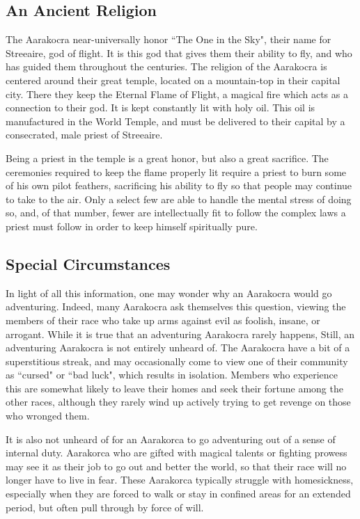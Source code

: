 \begin{multicols}{2}
\subsection{An Ancient Religion}
The Aarakocra near-universally honor ``The One in the Sky", their name for Streeaire, god of flight.
It is this god that gives them their ability to fly, and who has guided them throughout the centuries.
The religion of the Aarakocra is centered around their great temple, located on a mountain-top in their capital city.
There they keep the Eternal Flame of Flight, a magical fire which acts as a connection to their god.
It is kept constantly lit with holy oil.
This oil is manufactured in the World Temple, and must be delivered to their capital by a consecrated, male priest of Streeaire.

Being a priest in the temple is a great honor, but also a great sacrifice.
The ceremonies required to keep the flame properly lit require a priest to burn some of his own pilot feathers, sacrificing his ability to fly so that people may continue to take to the air.
Only a select few are able to handle the mental stress of doing so, and, of that number, fewer are intellectually fit to follow the complex laws a priest must follow in order to keep himself spiritually pure.

\subsection{Special Circumstances}
In light of all this information, one may wonder why an Aarakocra would go adventuring.
Indeed, many Aarakocra ask themselves this question, viewing the members of their race who take up arms against evil as foolish, insane, or arrogant.
While it is true that an adventuring Aarakocra rarely happens, 
Still, an adventuring Aarakocra is not entirely unheard of.
The Aarakocra have a bit of a superstitious streak, and may occasionally come to view one of their community as ``cursed" or ``bad luck", which results in isolation.
Members who experience this are somewhat likely to leave their homes and seek their fortune among the other races, although they rarely wind up actively trying to get revenge on those who wronged them.

It is also not unheard of for an Aarakorca to go adventuring out of a sense of internal duty.
Aarakorca who are gifted with magical talents or fighting prowess may see it as their job to go out and better the world, so that their race will no longer have to live in fear.
These Aarakorca typically struggle with homesickness, especially when they are forced to walk or stay in confined areas for an extended period, but often pull through by force of will.


\end{multicols}
